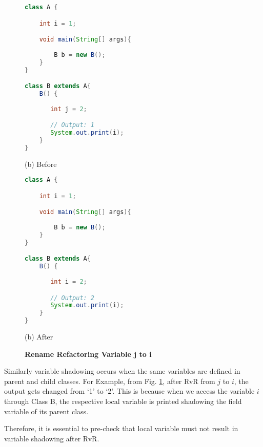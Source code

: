 \begin{figure}[th]
\centering
\begin{minipage}[t]{0.47\linewidth}
\begin{lstlisting}[language=java, basicstyle=\scriptsize\ttfamily,frame=single]
class A {

    int i = 1;

    void main(String[] args){
		
        B b = new B(); 
    }
}

class B extends A{
    B() {
    	
       int j = 2;

       // Output: 1
       System.out.print(i); 
    }
}
\end{lstlisting}
\centering(b) Before 
\end{minipage}
\hfill
\begin{minipage}[t]{0.47\linewidth}
\begin{lstlisting}[language=java, basicstyle=\scriptsize\ttfamily,frame=single]
class A {

    int i = 1;

    void main(String[] args){
		
        B b = new B(); 
    }
}

class B extends A{
    B() {
    	
       int i = 2;

       // Output: 2
       System.out.print(i); 
    }
}
\end{lstlisting}
\centering(b) After 
\end{minipage}
\caption{\textbf{Rename Refactoring Variable j to i}}
\label{figure:precond5_4}
\end{figure}



Similarly variable shadowing occurs when the same variables are defined in parent and child classes.
For Example, from Fig. \ref{figure:precond5_4}, after RvR from $j$ to $i$, the output gets changed from `1' to `2'. This is because when we access the variable $i$ through Class B, the respective local variable is printed shadowing the field variable of its parent class.

Therefore, it is essential to pre-check that local variable must not result in variable shadowing after RvR.